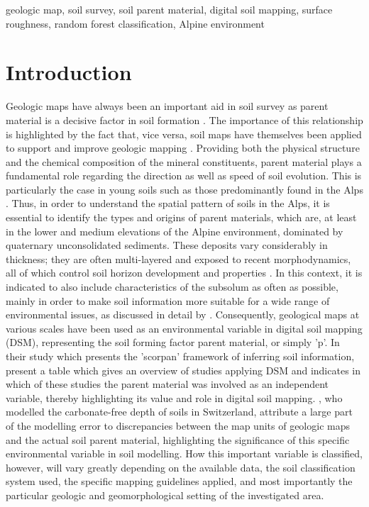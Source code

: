 \documentclass[preprint,12pt,authoryear]{elsarticle}
\begin{document}
\begin{frontmatter}
\begin{keyword}
geologic map, soil survey, soil parent material, digital soil mapping, surface roughness, random forest classification, Alpine environment
\end{keyword}

\end{frontmatter}

\linenumbers

\section{Introduction}


Geologic maps have always been an important aid in soil survey as parent material is a decisive factor in soil formation \citep{Jenny1941}. The importance of this relationship is highlighted by the fact that, vice versa, soil maps have themselves been applied to support and improve geologic mapping \citep{Brevik2015}. Providing both the physical structure and the chemical composition of the mineral constituents, parent material plays a fundamental role regarding the direction as well as speed of soil evolution.  This is particularly the case in young soils \citep{Schaetzl2000} such as those predominantly found in the Alps \citep{Geitner2017}.  Thus, in order to understand the spatial pattern of soils in the Alps, it is essential to identify  the types and origins of parent materials, which are, at least in the lower and medium elevations of the Alpine environment, dominated by quaternary unconsolidated sediments.  These deposits vary considerably in thickness; they are often multi-layered and exposed to recent morphodynamics, all of which control soil horizon development and properties \citep{Phillips2008}. In this context, it is indicated to also include characteristics of the subsolum as often as possible, mainly in order to make soil information more suitable for a wide range of environmental issues, as discussed in detail by \cite{Juilleret2016}. Consequently, geological maps at various scales have been used as an environmental variable in digital soil mapping (DSM), representing the soil forming factor parent material, or simply 'p'. In their study  which presents the 'scorpan' framework of inferring soil information, \cite{McBratney2003} present a table which gives an overview of studies applying DSM and indicates in which of these studies the parent material was involved as an independent variable, thereby highlighting its value and role in digital soil mapping.  \cite{Fracek2013}, who modelled the carbonate-free depth of soils in Switzerland, attribute a large part of the modelling error to discrepancies between the map units of geologic maps and the actual soil parent material, highlighting the significance of this specific environmental variable in soil modelling. How this important variable is classified, however, will vary greatly depending on the available data, the soil classification system used, the specific mapping guidelines applied, and most importantly the particular geologic and geomorphological setting of the investigated area.
\end{document}
